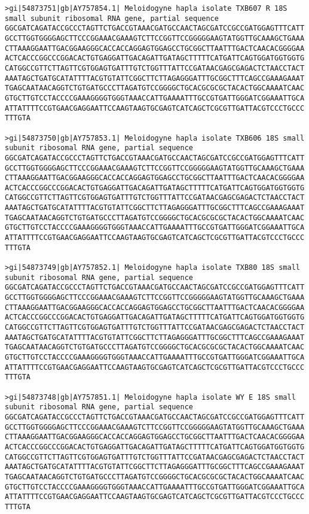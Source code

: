 \documentclass[11pt]{article}
\begin{document}
\begin{Verbatim}[commandchars=\\\{\}]
>gi|54873751|gb|AY757854.1| Meloidogyne hapla isolate TXB607 R 18S small subunit ribosomal RNA gene, partial sequence
GGCGATCAGATACCGCCCTAGTTCTGACCGTAAACGATGCCAACTAGCGATCCGCCGATGGAGTTTCATT
GCCTTGGTGGGGAGCTTCCCGGAAACGAAAGTCTTCCGGTTCCGGGGGAAGTATGGTTGCAAAGCTGAAA
CTTAAAGGAATTGACGGAAGGGCACCACCAGGAGTGGAGCCTGCGGCTTAATTTGACTCAACACGGGGAA
ACTCACCCGGCCCGGACACTGTGAGGATTGACAGATTGATAGCTTTTTCATGATTCAGTGGATGGTGGTG
CATGGCCGTTCTTAGTTCGTGGAGTGATTTGTCTGGTTTATTCCGATAACGAGCGAGACTCTAACCTACT
AAATAGCTGATGCATATTTTACGTGTATTCGGCTTCTTAGAGGGATTTGCGGCTTTCAGCCGAAAGAAAT
TGAGCAATAACAGGTCTGTGATGCCCTTAGATGTCCGGGGCTGCACGCGCGCTACACTGGCAAAATCAAC
GTGCTTGTCCTACCCCGAAAGGGGTGGGTAAACCATTGAAAATTTGCCGTGATTGGGATCGGAAATTGCA
ATTATTTTCCGTGAACGAGGAATTCCAAGTAAGTGCGAGTCATCAGCTCGCGTTGATTACGTCCCTGCCC
TTTGTA

>gi|54873750|gb|AY757853.1| Meloidogyne hapla isolate TXB606 18S small subunit ribosomal RNA gene, partial sequence
GGCGATCAGATACCGCCCTAGTTCTGACCGTAAACGATGCCAACTAGCGATCCGCCGATGGAGTTTCATT
GCCTTGGTGGGGAGCTTCCCGGAAACGAAAGTCTTCCGGTTCCGGGGGAAGTATGGTTGCAAAGCTGAAA
CTTAAAGGAATTGACGGAAGGGCACCACCAGGAGTGGAGCCTGCGGCTTAATTTGACTCAACACGGGGAA
ACTCACCCGGCCCGGACACTGTGAGGATTGACAGATTGATAGCTTTTTCATGATTCAGTGGATGGTGGTG
CATGGCCGTTCTTAGTTCGTGGAGTGATTTGTCTGGTTTATTCCGATAACGAGCGAGACTCTAACCTACT
AAATAGCTGATGCATATTTTACGTGTATTCGGCTTCTTAGAGGGATTTGCGGCTTTCAGCCGAAAGAAAT
TGAGCAATAACAGGTCTGTGATGCCCTTAGATGTCCGGGGCTGCACGCGCGCTACACTGGCAAAATCAAC
GTGCTTGTCCTACCCCGAAAGGGGTGGGTAAACCATTGAAAATTTGCCGTGATTGGGATCGGAAATTGCA
ATTATTTTCCGTGAACGAGGAATTCCAAGTAAGTGCGAGTCATCAGCTCGCGTTGATTACGTCCCTGCCC
TTTGTA

>gi|54873749|gb|AY757852.1| Meloidogyne hapla isolate TXB80 18S small subunit ribosomal RNA gene, partial sequence
GGCGATCAGATACCGCCCTAGTTCTGACCGTAAACGATGCCAACTAGCGATCCGCCGATGGAGTTTCATT
GCCTTGGTGGGGAGCTTCCCGGAAACGAAAGTCTTCCGGTTCCGGGGGAAGTATGGTTGCAAAGCTGAAA
CTTAAAGGAATTGACGGAAGGGCACCACCAGGAGTGGAGCCTGCGGCTTAATTTGACTCAACACGGGGAA
ACTCACCCGGCCCGGACACTGTGAGGATTGACAGATTGATAGCTTTTTCATGATTCAGTGGATGGTGGTG
CATGGCCGTTCTTAGTTCGTGGAGTGATTTGTCTGGTTTATTCCGATAACGAGCGAGACTCTAACCTACT
AAATAGCTGATGCATATTTTACGTGTATTCGGCTTCTTAGAGGGATTTGCGGCTTTCAGCCGAAAGAAAT
TGAGCAATAACAGGTCTGTGATGCCCTTAGATGTCCGGGGCTGCACGCGCGCTACACTGGCAAAATCAAC
GTGCTTGTCCTACCCCGAAAGGGGTGGGTAAACCATTGAAAATTTGCCGTGATTGGGATCGGAAATTGCA
ATTATTTTCCGTGAACGAGGAATTCCAAGTAAGTGCGAGTCATCAGCTCGCGTTGATTACGTCCCTGCCC
TTTGTA

>gi|54873748|gb|AY757851.1| Meloidogyne hapla isolate WY E 18S small subunit ribosomal RNA gene, partial sequence
GGCGATCAGATACCGCCCTAGTTCTGACCGTAAACGATGCCAACTAGCGATCCGCCGATGGAGTTTCATT
GCCTTGGTGGGGAGCTTCCCGGAAACGAAAGTCTTCCGGTTCCGGGGGAAGTATGGTTGCAAAGCTGAAA
CTTAAAGGAATTGACGGAAGGGCACCACCAGGAGTGGAGCCTGCGGCTTAATTTGACTCAACACGGGGAA
ACTCACCCGGCCCGGACACTGTGAGGATTGACAGATTGATAGCTTTTTCATGATTCAGTGGATGGTGGTG
CATGGCCGTTCTTAGTTCGTGGAGTGATTTGTCTGGTTTATTCCGATAACGAGCGAGACTCTAACCTACT
AAATAGCTGATGCATATTTTACGTGTATTCGGCTTCTTAGAGGGATTTGCGGCTTTCAGCCGAAAGAAAT
TGAGCAATAACAGGTCTGTGATGCCCTTAGATGTCCGGGGCTGCACGCGCGCTACACTGGCAAAATCAAC
GTGCTTGTCCTACCCCGAAAGGGGTGGGTAAACCATTGAAAATTTGCCGTGATTGGGATCGGAAATTGCA
ATTATTTTCCGTGAACGAGGAATTCCAAGTAAGTGCGAGTCATCAGCTCGCGTTGATTACGTCCCTGCCC
TTTGTA


\end{Verbatim}
\end{document}
